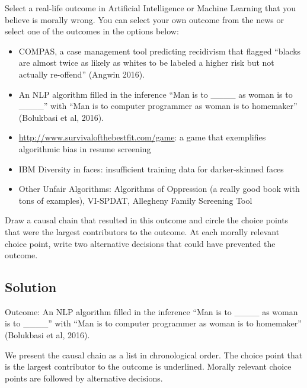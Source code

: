 \documentclass[submit]{harvardml}
\begin{document}
\begin{problem}

Select a real-life outcome in Artificial Intelligence or Machine Learning 
that you believe is morally wrong. You can select your own outcome from 
the news or select one of the outcomes in the options below:

\begin{itemize}
    \item COMPAS, a case management tool predicting recidivism that 
        flagged “blacks are almost twice as likely as whites to be 
        labeled a higher risk but not actually re-offend” (Angwin 
        2016).
        
    \item An NLP algorithm filled in the inference “Man is to 
        \_\_\_\_ as woman is to \_\_\_\_” with “Man is 
        to computer programmer as woman is to homemaker” (Bolukbasi 
        et al, 2016).
        
    \item \url{http://www.survivalofthebestfit.com/game}: a game that 
        exemplifies algorithmic bias in resume screening
        
    \item IBM Diversity in faces: insufficient training data for 
        darker-skinned faces
        
    \item Other Unfair Algorithms: Algorithms of Oppression (a really 
        good book with tons of examples), VI-SPDAT, Allegheny Family 
        Screening Tool
        
\end{itemize}
Draw a causal chain that resulted in this outcome and circle the choice points that were the largest contributors to the outcome. At each morally relevant choice point, write two alternative decisions that could have prevented the outcome.

\end{problem}

\subsection*{Solution}

Outcome: An NLP algorithm filled in the inference “Man is to 
\_\_\_\_ as woman is to \_\_\_\_” with “Man is 
to computer programmer as woman is to homemaker” (Bolukbasi 
et al, 2016).

We present the causal chain as a list in chronological order. The choice point that is the largest contributor to the outcome is underlined. Morally relevant choice points are followed by alternative decisions.
\end{document}
